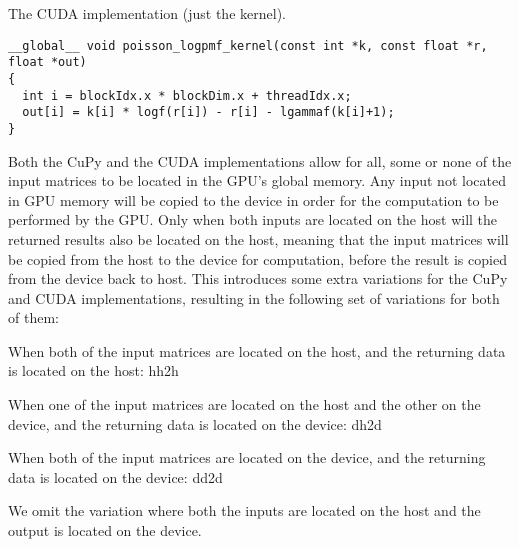 
The CUDA implementation (just the kernel).
\begin{lstlisting}
__global__ void poisson_logpmf_kernel(const int *k, const float *r, float *out)
{
  int i = blockIdx.x * blockDim.x + threadIdx.x;
  out[i] = k[i] * logf(r[i]) - r[i] - lgammaf(k[i]+1);
}
\end{lstlisting}


Both the CuPy and the CUDA implementations allow for all, some or none of the input matrices to be located in the GPU's global memory. 
Any input not located in GPU memory will be copied to the device in order for the computation to be performed by the GPU.
Only when both inputs are located on the host will the returned results also be located on the host, meaning that the input matrices will be copied from the host to the device for computation, before the result is copied from the device back to host.
This introduces some extra variations for the CuPy and CUDA implementations, resulting in the following set of variations for both of them:
\begin{compactitem}
  \item
    When both of the input matrices are located on the host, and the returning data is located on the host: hh2h
  \item
    When one of the input matrices are located on the host and the other on the device, and the returning data is located on the device: dh2d
  \item
    When both of the input matrices are located on the device, and the returning data is located on the device: dd2d
\end{compactitem}
We omit the variation where both the inputs are located on the host and the output is located on the device.

